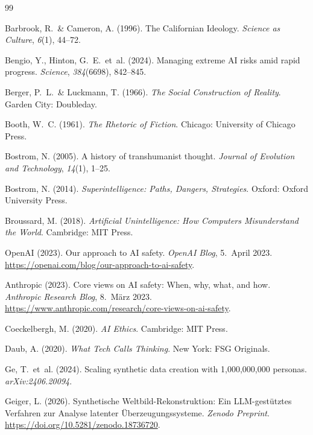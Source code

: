 \documentclass[12pt,a4paper]{article}
\begin{document}
\begin{thebibliography}{99}

  Barbrook, R.~\& Cameron, A. (1996).
  The Californian Ideology.
  \textit{Science as Culture}, \textit{6}(1), 44--72.

  Bengio, Y., Hinton, G.~E.~et~al. (2024).
  Managing extreme AI risks amid rapid progress.
  \textit{Science}, \textit{384}(6698), 842--845.

  Berger, P.~L.~\& Luckmann, T. (1966).
  \textit{The Social Construction of Reality}.
  Garden City: Doubleday.

  Booth, W.~C. (1961).
  \textit{The Rhetoric of Fiction}.
  Chicago: University of Chicago Press.

  Bostrom, N. (2005).
  A history of transhumanist thought.
  \textit{Journal of Evolution and Technology}, \textit{14}(1), 1--25.

  Bostrom, N. (2014).
  \textit{Superintelligence: Paths, Dangers, Strategies}.
  Oxford: Oxford University Press.

  Broussard, M. (2018).
  \textit{Artificial Unintelligence: How Computers Misunderstand the World}.
  Cambridge: MIT Press.

  OpenAI (2023).
  Our approach to AI safety.
  \textit{OpenAI Blog}, 5.~April 2023.
  \url{https://openai.com/blog/our-approach-to-ai-safety}.

  Anthropic (2023).
  Core views on AI safety: When, why, what, and how.
  \textit{Anthropic Research Blog}, 8.~M\"arz 2023.
  \url{https://www.anthropic.com/research/core-views-on-ai-safety}.

  Coeckelbergh, M. (2020).
  \textit{AI Ethics}.
  Cambridge: MIT Press.

  Daub, A. (2020).
  \textit{What Tech Calls Thinking}.
  New York: FSG Originals.

  Ge, T.~et~al. (2024).
  Scaling synthetic data creation with 1{,}000{,}000{,}000 personas.
  \textit{arXiv:2406.20094}.

  Geiger, L. (2026).
  Synthetische Weltbild-Rekonstruktion: Ein LLM-gest\"utztes Verfahren zur Analyse latenter \"Uberzeugungssysteme.
  \textit{Zenodo Preprint}. \url{https://doi.org/10.5281/zenodo.18736720}.


\end{thebibliography}
\end{document}
